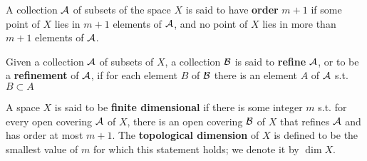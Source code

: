 \documentclass[11pt]{article}
\begin{document}
\begin{definition}
A collection \(\mathcal{A}\) of subsets of the space \(X\) is said to have \textbf{order} \(m+1\) if some point
of \(X\) lies in \(m+1\) elements of \(\mathcal{A}\), and no point of \(X\) lies in more than \(m+1\)
elements of \(\mathcal{A}\).
\end{definition}

Given a collection \(\mathcal{A}\) of subsets of \(X\), a collection \(\mathcal{B}\) is said to \textbf{refine} \(\mathcal{A}\), or to
be a \textbf{refinement} of \(\mathcal{A}\), if for each element \(B\) of \(\mathcal{B}\) there is an element \(A\) of \(\mathcal{A}\)
s.t. \(B\subset A\)

\begin{definition}[]
A space \(X\) is said to be \textbf{finite dimensional} if there is some integer \(m\) s.t. for every
open covering \(\mathcal{A}\) of \(X\), there is an open covering \(\mathcal{B}\) of \(X\) that refines \(\mathcal{A}\) and
has order at most \(m+1\). The \textbf{topological dimension} of \(X\) is defined to be the smallest
value of \(m\) for which this statement holds; we denote it by \(\dim X\).
\end{definition}
\end{document}
